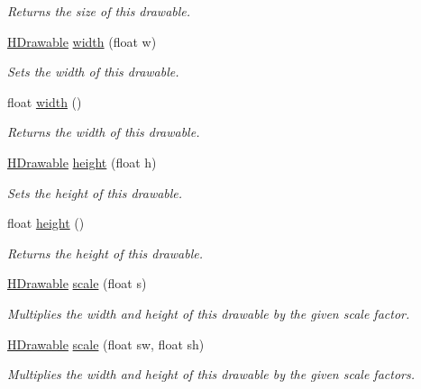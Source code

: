 \begin{DoxyCompactItemize}
\begin{DoxyCompactList}\small\item\em Returns the size of this drawable. \end{DoxyCompactList}\item 
\hyperlink{classhype_1_1core_1_1drawable_1_1_h_drawable}{H\-Drawable} \hyperlink{classhype_1_1core_1_1drawable_1_1_h_drawable_ab77fd9fd384525f3d882a66cb7f006a5}{width} (float w)
\begin{DoxyCompactList}\small\item\em Sets the width of this drawable. \end{DoxyCompactList}\item 
float \hyperlink{classhype_1_1core_1_1drawable_1_1_h_drawable_a3c12eb4fa138e5a198ea1634cd2932ca}{width} ()
\begin{DoxyCompactList}\small\item\em Returns the width of this drawable. \end{DoxyCompactList}\item 
\hyperlink{classhype_1_1core_1_1drawable_1_1_h_drawable}{H\-Drawable} \hyperlink{classhype_1_1core_1_1drawable_1_1_h_drawable_ad361b8eaa72b4d79b0b62de0e2a2776d}{height} (float h)
\begin{DoxyCompactList}\small\item\em Sets the height of this drawable. \end{DoxyCompactList}\item 
float \hyperlink{classhype_1_1core_1_1drawable_1_1_h_drawable_a60c5ca2c8e2fc75fda7221cf4f74010b}{height} ()
\begin{DoxyCompactList}\small\item\em Returns the height of this drawable. \end{DoxyCompactList}\item 
\hyperlink{classhype_1_1core_1_1drawable_1_1_h_drawable}{H\-Drawable} \hyperlink{classhype_1_1core_1_1drawable_1_1_h_drawable_a64746f11d225482739741a694b23cea5}{scale} (float s)
\begin{DoxyCompactList}\small\item\em Multiplies the width and height of this drawable by the given scale factor. \end{DoxyCompactList}\item 
\hyperlink{classhype_1_1core_1_1drawable_1_1_h_drawable}{H\-Drawable} \hyperlink{classhype_1_1core_1_1drawable_1_1_h_drawable_adac661c14251dee5d5b9237fccbb5b16}{scale} (float sw, float sh)
\begin{DoxyCompactList}\small\item\em Multiplies the width and height of this drawable by the given scale factors. \end{DoxyCompactList}\item 

\end{DoxyCompactItemize}
